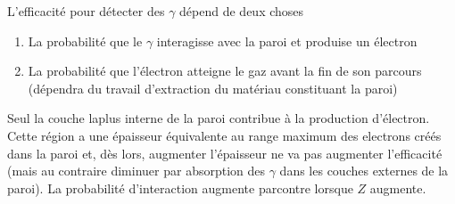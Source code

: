 L'efficacité pour détecter des $\gamma$ dépend de deux choses 
\begin{enumerate}
\item La probabilité que le $\gamma$ interagisse avec la paroi et produise un électron
\item La probabilité que l'électron atteigne le gaz avant la fin de son parcours (dépendra du travail
d'extraction du matériau constituant la paroi)
\end{enumerate}
Seul la couche laplus interne de la paroi contribue à la production d'électron. Cette région a une épaisseur équivalente au range maximum des electrons créés dans la paroi et, dès lors, augmenter
l'épaisseur ne va pas augmenter l'efficacité (mais au contraire diminuer par absorption des 
$\gamma$ dans les couches externes de la paroi). La probabilité d'interaction augmente parcontre
lorsque $Z$ augmente.
	







